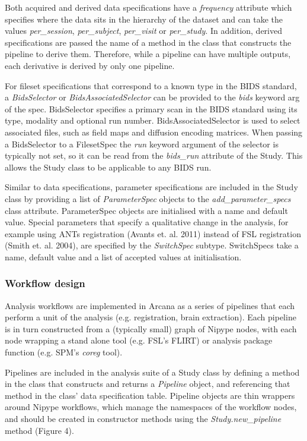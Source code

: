 Both acquired and derived data specifications have a \emph{frequency}
attribute which specifies where the data sits in the hierarchy of the
dataset and can take the values \emph{per\_session},
\emph{per\_subject}, \emph{per\_visit} or \emph{per\_study}. In
addition, derived specifications are passed the name of a method in the
class that constructs the pipeline to derive them. Therefore, while a
pipeline can have multiple outputs, each derivative is derived by only
one pipeline.

For fileset specifications that correspond to a known type in the BIDS
standard, a \emph{BidsSelector} or \emph{BidsAssociatedSelector} can be
provided to the \emph{bids} keyword arg of the spec. BidsSelector
specifies a primary scan in the BIDS standard using its type, modality
and optional run number. BidsAssociatedSelector is used to select
associated files, such as field maps and diffusion encoding matrices.
When passing a BidsSelector to a FilesetSpec the \emph{run} keyword
argument of the selector is typically not set, so it can be read from
the \emph{bids\_run} attribute of the Study. This allows the Study class
to be applicable to any BIDS run.

Similar to data specifications, parameter specifications are included in
the Study class by providing a list of \emph{ParameterSpec} objects to
the \emph{add\_parameter\_specs} class attribute. ParameterSpec objects
are initialised with a name and default value. Special parameters that
specify a qualitative change in the analysis, for example using ANTs
registration (Avants et. al. 2011) instead of FSL registration (Smith
et. al. 2004), are specified by the \emph{SwitchSpec} subtype.
SwitchSpecs take a name, default value and a list of accepted values at
initialisation.

\subsubsection{Workflow design}
\label{workflow-design}

Analysis workflows are implemented in Arcana as a series of pipelines
that each perform a unit of the analysis (e.g. registration, brain
extraction). Each pipeline is in turn constructed from a (typically
small) graph of Nipype nodes, with each node wrapping a stand alone tool
(e.g. FSL's FLIRT) or analysis package function (e.g. SPM's \emph{coreg}
tool).

Pipelines are included in the analysis suite of a Study class by
defining a method in the class that constructs and returns a
\emph{Pipeline} object, and referencing that method in the class' data
specification table. Pipeline objects are thin wrappers around Nipype
workflows, which manage the namespaces of the workflow nodes, and should
be created in constructor methods using the \emph{Study.new\_pipeline}
method (Figure 4).

